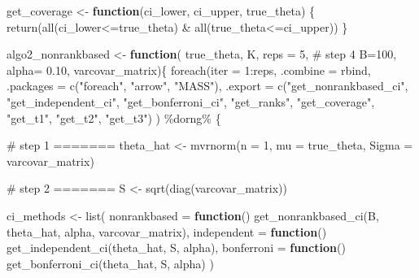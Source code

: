 \documentclass[
  12pt,
  a4paper,
]{article}
\newenvironment{Shaded}{\begin{snugshade}}{\end{snugshade}}
\newcommand{\AttributeTok}[1]{\textcolor[rgb]{0.00,0.34,0.68}{#1}}
\newcommand{\CommentTok}[1]{\textcolor[rgb]{0.54,0.53,0.53}{#1}}
\newcommand{\ControlFlowTok}[1]{\textcolor[rgb]{0.12,0.11,0.11}{\textbf{#1}}}
\newcommand{\DecValTok}[1]{\textcolor[rgb]{0.69,0.50,0.00}{#1}}
\newcommand{\FloatTok}[1]{\textcolor[rgb]{0.69,0.50,0.00}{#1}}
\newcommand{\FunctionTok}[1]{\textcolor[rgb]{0.39,0.29,0.61}{#1}}
\newcommand{\NormalTok}[1]{\textcolor[rgb]{0.12,0.11,0.11}{#1}}
\newcommand{\OtherTok}[1]{\textcolor[rgb]{0.00,0.43,0.16}{#1}}
\newcommand{\SpecialCharTok}[1]{\textcolor[rgb]{0.24,0.68,0.91}{#1}}
\newcommand{\StringTok}[1]{\textcolor[rgb]{0.75,0.01,0.01}{#1}}
\numberwithin{equation}{section}
\begin{document}
\begin{Shaded}
\begin{Highlighting}[]
\NormalTok{get\_coverage }\OtherTok{\textless{}{-}} \ControlFlowTok{function}\NormalTok{(ci\_lower,}
\NormalTok{                         ci\_upper,}
\NormalTok{                         true\_theta) \{}
  \FunctionTok{return}\NormalTok{(}\FunctionTok{all}\NormalTok{(ci\_lower}\SpecialCharTok{\textless{}=}\NormalTok{true\_theta) }\SpecialCharTok{\&} \FunctionTok{all}\NormalTok{(true\_theta}\SpecialCharTok{\textless{}=}\NormalTok{ci\_upper))}
\NormalTok{\}}

\NormalTok{algo2\_nonrankbased }\OtherTok{\textless{}{-}} \ControlFlowTok{function}\NormalTok{(}
\NormalTok{    true\_theta,}
\NormalTok{    K, }
    \AttributeTok{reps =} \DecValTok{5}\NormalTok{, }\CommentTok{\# step 4}
    \AttributeTok{B=}\DecValTok{100}\NormalTok{, }
    \AttributeTok{alpha=} \FloatTok{0.10}\NormalTok{,}
\NormalTok{    varcovar\_matrix)\{}
  \FunctionTok{foreach}\NormalTok{(}\AttributeTok{iter =} \DecValTok{1}\SpecialCharTok{:}\NormalTok{reps, }
          \AttributeTok{.combine =}\NormalTok{ rbind,}
          \AttributeTok{.packages =} \FunctionTok{c}\NormalTok{(}\StringTok{"foreach"}\NormalTok{, }\StringTok{"arrow"}\NormalTok{, }\StringTok{"MASS"}\NormalTok{),}
          \AttributeTok{.export =} \FunctionTok{c}\NormalTok{(}\StringTok{"get\_nonrankbased\_ci"}\NormalTok{, }\StringTok{"get\_independent\_ci"}\NormalTok{,}
                      \StringTok{"get\_bonferroni\_ci"}\NormalTok{, }\StringTok{"get\_ranks"}\NormalTok{, }\StringTok{"get\_coverage"}\NormalTok{,}
                      \StringTok{"get\_t1"}\NormalTok{, }\StringTok{"get\_t2"}\NormalTok{, }\StringTok{"get\_t3"}\NormalTok{)}
\NormalTok{  ) }\SpecialCharTok{\%dorng\%}\NormalTok{ \{}
    
    \CommentTok{\# step 1 =======}
\NormalTok{    theta\_hat }\OtherTok{\textless{}{-}} \FunctionTok{mvrnorm}\NormalTok{(}\AttributeTok{n =} \DecValTok{1}\NormalTok{, }
                         \AttributeTok{mu =}\NormalTok{ true\_theta, }
                         \AttributeTok{Sigma =}\NormalTok{ varcovar\_matrix)}
    
    \CommentTok{\# step 2 =======}
\NormalTok{    S }\OtherTok{\textless{}{-}} \FunctionTok{sqrt}\NormalTok{(}\FunctionTok{diag}\NormalTok{(varcovar\_matrix))}
    
\NormalTok{    ci\_methods }\OtherTok{\textless{}{-}} \FunctionTok{list}\NormalTok{(}
      \AttributeTok{nonrankbased =} \ControlFlowTok{function}\NormalTok{() }\FunctionTok{get\_nonrankbased\_ci}\NormalTok{(B, theta\_hat, alpha, }
\NormalTok{                                                    varcovar\_matrix),}
      \AttributeTok{independent  =} \ControlFlowTok{function}\NormalTok{() }\FunctionTok{get\_independent\_ci}\NormalTok{(theta\_hat, S, alpha),}
      \AttributeTok{bonferroni   =} \ControlFlowTok{function}\NormalTok{() }\FunctionTok{get\_bonferroni\_ci}\NormalTok{(theta\_hat, S, alpha)}
\NormalTok{    )}
    

\end{Highlighting}
\end{Shaded}
\end{document}
